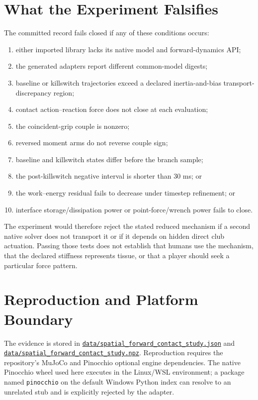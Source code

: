 \documentclass[
  letterpaper,
]{report}
\providecommand{\tightlist}{%
  \setlength{\itemsep}{0pt}\setlength{\parskip}{0pt}}
\begin{document}
\section{What the Experiment
Falsifies}\label{sec-spatial-forward-falsifiers}

The committed record fails closed if any of these conditions occurs:

\begin{enumerate}
\def\labelenumi{\arabic{enumi}.}
\tightlist
\item
  either imported library lacks its native model and forward-dynamics
  API;
\item
  the generated adapters report different common-model digests;
\item
  baseline or killswitch trajectories exceed a declared inertia-and-bias
  transport-discrepancy region;
\item
  contact action--reaction force does not close at each evaluation;
\item
  the coincident-grip couple is nonzero;
\item
  reversed moment arms do not reverse couple sign;
\item
  baseline and killswitch states differ before the branch sample;
\item
  the post-killswitch negative interval is shorter than 30 ms; or
\item
  the work--energy residual fails to decrease under timestep refinement;
  or
\item
  interface storage/dissipation power or point-force/wrench power fails
  to close.
\end{enumerate}

The experiment would therefore reject the stated reduced mechanism if a
second native solver does not transport it or if it depends on hidden
direct club actuation. Passing those tests does not establish that
humans use the mechanism, that the declared stiffness represents tissue,
or that a player should seek a particular force pattern.

\section{Reproduction and Platform
Boundary}\label{sec-spatial-forward-reproduction}

The evidence is stored in
\href{https://github.com/D-sorganization/UpstreamDrift/blob/main/docs/research/proximal_distal_energy_transfer/data/spatial_forward_contact_study.json}{\texttt{data/spatial\_forward\_contact\_study.json}}
and
\href{https://github.com/D-sorganization/UpstreamDrift/blob/main/docs/research/proximal_distal_energy_transfer/data/spatial_forward_contact_study.npz}{\texttt{data/spatial\_forward\_contact\_study.npz}}.
Reproduction requires the repository's MuJoCo and Pinocchio optional
engine dependencies. The native Pinocchio wheel used here executes in
the Linux/WSL environment; a package named \texttt{pinocchio} on the
default Windows Python index can resolve to an unrelated stub and is
explicitly rejected by the adapter.
\end{document}
